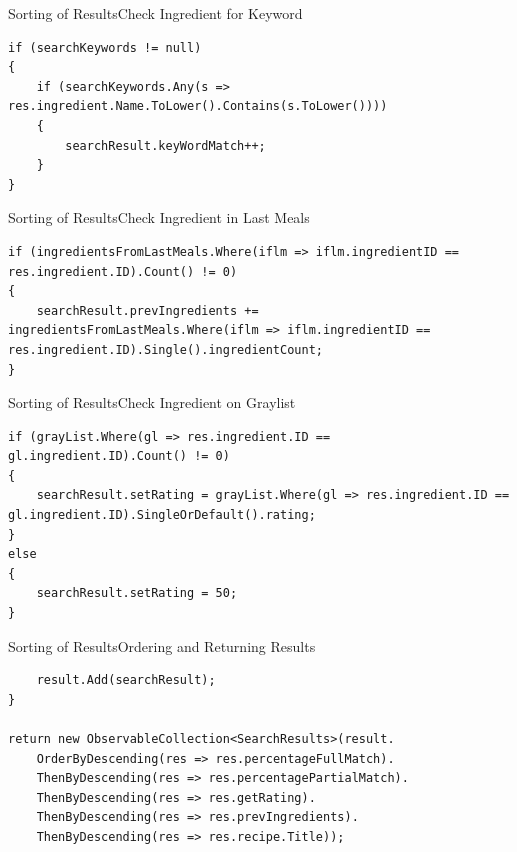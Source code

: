\begin{frame}[fragile]{Sorting of Results}{Check Ingredient for Keyword}
\begin{lstlisting}
if (searchKeywords != null)
{
    if (searchKeywords.Any(s => res.ingredient.Name.ToLower().Contains(s.ToLower())))
    {
        searchResult.keyWordMatch++;
    }
}
\end{lstlisting}
\end{frame}

\begin{frame}[fragile]{Sorting of Results}{Check Ingredient in Last Meals}
\begin{lstlisting}
if (ingredientsFromLastMeals.Where(iflm => iflm.ingredientID == res.ingredient.ID).Count() != 0)
{
    searchResult.prevIngredients += ingredientsFromLastMeals.Where(iflm => iflm.ingredientID == res.ingredient.ID).Single().ingredientCount;
}
\end{lstlisting}
\end{frame}

\begin{frame}[fragile]{Sorting of Results}{Check Ingredient on Graylist}
\begin{lstlisting}
if (grayList.Where(gl => res.ingredient.ID == gl.ingredient.ID).Count() != 0)
{
    searchResult.setRating = grayList.Where(gl => res.ingredient.ID == gl.ingredient.ID).SingleOrDefault().rating;
}
else
{
    searchResult.setRating = 50;
}
\end{lstlisting}
\end{frame}

\begin{frame}[fragile]{Sorting of Results}{Ordering and Returning Results}
\begin{lstlisting}
    result.Add(searchResult);
}

return new ObservableCollection<SearchResults>(result.
    OrderByDescending(res => res.percentageFullMatch).
    ThenByDescending(res => res.percentagePartialMatch).
    ThenByDescending(res => res.getRating).
    ThenByDescending(res => res.prevIngredients).
    ThenByDescending(res => res.recipe.Title));
\end{lstlisting}
\end{frame}




















